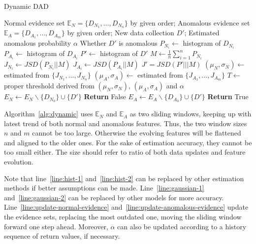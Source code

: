 \documentclass[10pt,conference,letterpaper]{IEEEtran}
\begin{document}
			\begin{algorithm}[!ht]
				\caption{Dynamic DAD}
				\label{alg:dynamic}
				\begin{algorithmic}[1]
					\Require Normal evidence set $\mathbb{E}_N = \{D_{N_1}, \dots, D_{N_n}\}$ by given order; Anomalous evidence set $\mathbb{E}_A = \{D_{A_1}, \dots, D_{A_m}\}$ by given order; New data collection $D'$; Estimated anomalous probability $\alpha$
					\Ensure Whether $D'$ is anomalous
					\State $P_{N_i} \gets$ histogram of $D_{N_i}$\label{line:hist-1}
					\EndFor
					\State $P_{A_i} \gets$ histogram of $D_{A_i}$\label{line:hist-2}
					\EndFor
					\State $P' \gets$ histogram of $D'$
					\State $M \gets \frac{1}{n}\sum_{i=1}^{n}P_{N_i}$
					\State $J_{N_i} \gets JSD(P_{N_i}||M)$
					\EndFor
					\State $J_{A_i} \gets JSD(P_{A_i}||M)$
					\EndFor
					\State $J' = JSD(P'|||M)$
					\State $(\mu_N, \sigma_N) \gets$ estimated from $\{J_{N_1}, \dots, J_{N_n}\}$\label{line:gaussian-1}
					\State $(\mu_A, \sigma_A) \gets$ estimated from $\{J_{A_1}, \dots, J_{A_m}\}$\label{line:gaussian-2}
					\State $T \gets$ proper threshold derived from $(\mu_N, \sigma_N)$, $(\mu_A, \sigma_A)$ and $\alpha$
					\State $E_N \gets E_N \backslash \{D_{N_0}\} \cup \{D'\}$\label{line:update-normal-evidence}
					\State \textbf{Return} False
					\Else
					\State $E_A \gets E_A \backslash \{D_{A_0}\} \cup \{D'\}$\label{line:update-anomalous-evidence}
					\State \textbf{Return} True
					\EndIf
				\end{algorithmic}
			\end{algorithm}
	
			Algorithm~\ref{alg:dynamic} uses $\mathbb{E}_N$ and $\mathbb{E}_A$ as two sliding windows, keeping up with latest trend of both normal and anomalous features. Thus, the two window sizes $n$ and $m$ cannot be too large. Otherwise the evolving features will be flattened and aligned to the older ones. For the sake of estimation accuracy, they cannot be too small either. The size should refer to ratio of both data updates and feature evolution.
			
			Note that line~\ref{line:hist-1} and~\ref{line:hist-2} can be replaced by other estimation methods if better assumptions can be made. Line~\ref{line:gaussian-1} and~\ref{line:gaussian-2} can be replaced by other models for more accuracy. Line~\ref{line:update-normal-evidence} and~\ref{line:update-anomalous-evidence} update the evidence sets, replacing the most outdated one, moving the sliding window forward one step ahead. Moreover, $\alpha$ can also be updated according to a history sequence of return values, if necessary.
	
\end{document}
